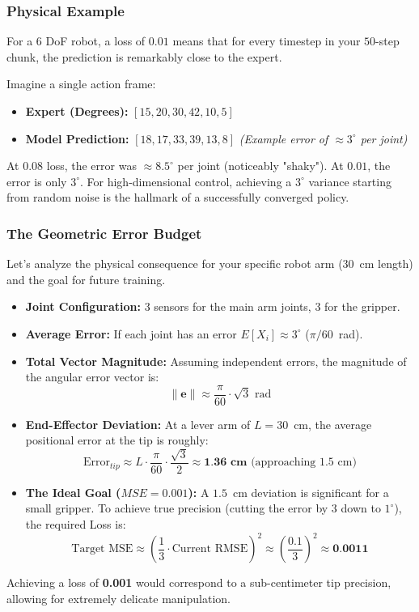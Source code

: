 \documentclass[11pt,a4paper]{article}
\begin{document}
\subsubsection*{Physical Example}
For a $6$ DoF robot, a loss of \textbf{$0.01$} means that for every timestep in your $50$-step chunk, the prediction is remarkably close to the expert. 

Imagine a single action frame:
\begin{itemize}
    \item \textbf{Expert (Degrees):} $[15, 20, 30, 42, 10, 5]$
    \item \textbf{Model Prediction:} $[18, 17, 33, 39, 13, 8]$  \textit{(Example error of $\approx 3^\circ$ per joint)}
\end{itemize}

At $0.08$ loss, the error was $\approx 8.5^\circ$ per joint (noticeably "shaky"). At $0.01$, the error is only \textbf{$3^\circ$}. For high-dimensional control, achieving a $3^\circ$ variance starting from random noise is the hallmark of a successfully converged policy.

\subsubsection*{The Geometric Error Budget}
Let's analyze the physical consequence for your specific robot arm ($30$~cm length) and the goal for future training.
\begin{itemize}
    \item \textbf{Joint Configuration:} 3 sensors for the main arm joints, 3 for the gripper. 
    \item \textbf{Average Error:} If each joint has an error $E[X_i] \approx 3^\circ$ ($\pi/60$~rad).
    \item \textbf{Total Vector Magnitude:} Assuming independent errors, the magnitude of the angular error vector is:
    \[ \|\mathbf{e}\| \approx \frac{\pi}{60} \cdot \sqrt{3} \text{ rad} \]
    \item \textbf{End-Effector Deviation:} At a lever arm of $L = 30$~cm, the average positional error at the tip is roughly:
    \[ \text{Error}_{tip} \approx L \cdot \frac{\pi}{60} \cdot \frac{\sqrt{3}}{2} \approx \textbf{1.36 cm} \text{ (approaching 1.5 cm)} \]
    \item \textbf{The Ideal Goal ($MSE = 0.001$):} A $1.5$~cm deviation is significant for a small gripper. To achieve true precision (cutting the error by 3 down to $1^\circ$), the required Loss is:
    \[ \text{Target MSE} \approx \left(\frac{1}{3} \cdot \text{Current RMSE}\right)^2 \approx \left(\frac{0.1}{3}\right)^2 \approx \textbf{0.0011} \]
\end{itemize}
Achieving a loss of \textbf{0.001} would correspond to a sub-centimeter tip precision, allowing for extremely delicate manipulation.
\end{document}
